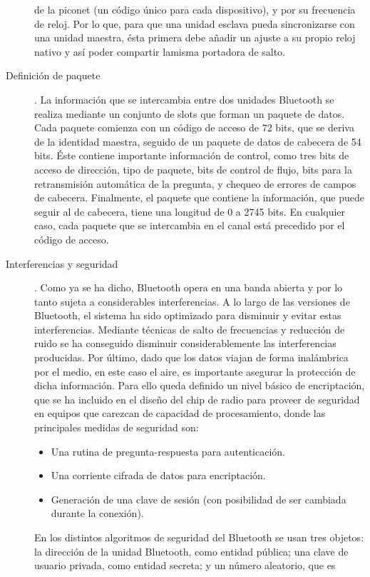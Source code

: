 \begin{description}
de la piconet (un código único para cada dispositivo), y por su frecuencia 
de reloj. Por lo que, para que una unidad esclava pueda sincronizarse con 
una unidad maestra, ésta primera debe añadir un ajuste a su propio reloj 
nativo y así poder compartir lamisma portadora de salto.
\item[Definición de paquete].
La información que se intercambia entre dos unidades Bluetooth se realiza
mediante un conjunto de slots que forman un paquete de datos. Cada paquete 
comienza con un código de acceso de 72 bits, que se deriva de la identidad 
maestra, seguido de un paquete de datos de cabecera de 54 bits. Éste 
contiene importante información de control, como tres bits de acceso de 
dirección, tipo de paquete, bits de control de flujo, bits para la 
retransmisión automática de la pregunta, y chequeo de errores de campos de 
cabecera.
Finalmente, el paquete que contiene la información, que puede seguir al de 
cabecera, tiene una longitud de 0 a 2745 bits. En cualquier caso, cada 
paquete que se intercambia en el canal está precedido por el código de 
acceso. 
\item[Interferencias y seguridad].
Como ya se ha dicho, Bluetooth opera en una banda abierta y por lo tanto 
sujeta a considerables interferencias. A lo largo de las versiones de 
Bluetooth, el sistema ha sido optimizado para disminuir y evitar estas 
interferencias. Mediante técnicas de salto de frecuencias y reducción de 
ruido se ha conseguido disminuir considerablemente las interferencias 
producidas.
Por último, dado que los datos viajan de forma inalámbrica por el medio, en 
este caso el aire, es importante asegurar la protección de dicha 
información. Para ello queda definido un nivel básico de encriptación, que 
se ha incluido en el diseño del chip de radio para proveer de seguridad en 
equipos que carezcan de capacidad de procesamiento, donde las principales 
medidas de seguridad son:
\begin{itemize}
\item Una rutina de pregunta-respuesta para autenticación.
\item Una corriente cifrada de datos para encriptación.
\item Generación de una clave de sesión (con posibilidad de ser cambiada 
durante la conexión).
\end{itemize}
En los distintos algoritmos de seguridad del Bluetooth se usan tres objetos: 
la dirección de la unidad Bluetooth, como entidad pública; una clave de 
usuario privada, como entidad secreta; y un número aleatorio, que es 

\end{description}
